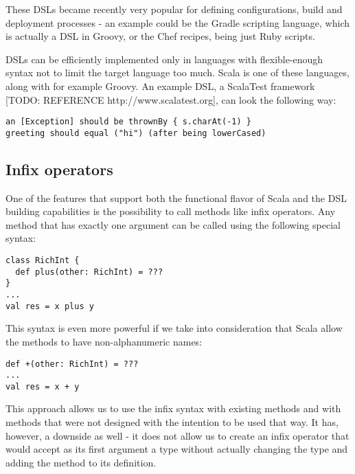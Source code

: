 These DSLs became recently very popular for defining configurations, build and deployment processes - an example could be the Gradle scripting language, which is actually a DSL in Groovy, or the Chef recipes, being just Ruby scripts.

DSLs can be efficiently implemented only in languages with flexible-enough syntax not to limit the target language too much. Scala is one of these languages, along with for example Groovy. An example DSL, a ScalaTest framework [TODO: REFERENCE http://www.scalatest.org], can look the following way:

\lstset{style=Scala}
\begin{lstlisting}
an [Exception] should be thrownBy { s.charAt(-1) }
greeting should equal ("hi") (after being lowerCased)
\end{lstlisting}



\subsection{Infix operators}
\label{subsec:infixops}

One of the features that support both the functional flavor of Scala and the DSL building capabilities is the possibility to call methods like infix operators. Any method that has exactly one argument can be called using the following special syntax:

\lstset{style=Scala}
\begin{lstlisting}
class RichInt {
  def plus(other: RichInt) = ???
}
...
val res = x plus y
\end{lstlisting}

This syntax is even more powerful if we take into consideration that Scala allow the methods to have non-alphanumeric names:

\lstset{style=Scala}
\begin{lstlisting}
def +(other: RichInt) = ???
...
val res = x + y
\end{lstlisting}

This approach allows us to use the infix syntax with existing methods and with methods that were not designed with the intention to be used that way. It has, however, a downside as well - it does not allow us to create an infix operator that would accept as its first argument a type without actually changing the type and adding the method to its definition. 

